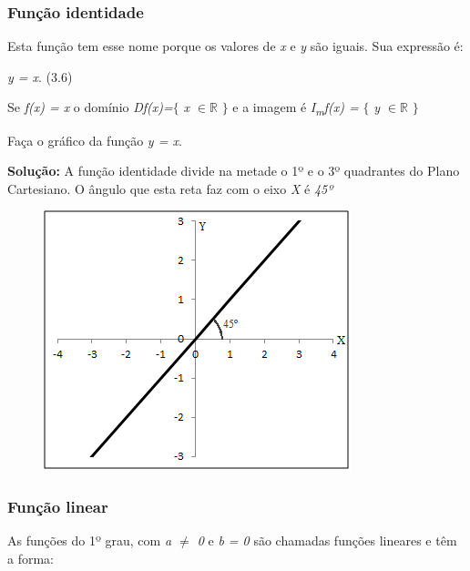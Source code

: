 \subsubsection{Função identidade}

Esta função tem esse nome porque os valores de \textit{x} e \textit{y} são iguais. Sua expressão é:

\begin{caixa}
\textit{y = x}. \tab (3.6)
\end{caixa}

Se \textit{f(x) = x}  o domínio \textit{Df(x)=}$ \{ $ \textit{ x $ \in \mathbb{R} $} $ \} $  e a imagem é \textit{I\textsubscript{m}f(x) =} $ \{ $ \textit{ y $ \in \mathbb{R} $} $ \} $ \qedsymbol{}

\begin{texemplo}
Faça o gráfico da função  \textit{y = x}.

\textbf{Solução:} A função identidade divide na metade o 1º e o 3º quadrantes do Plano Cartesiano. O ângulo que esta reta faz com o eixo \textit{X} é \textit{45º }\qedsymbol{}

\begin{figure}[H]
	\begin{Center}
		\includegraphics[width=3.52in,height=2.98in]{capitulos/funcao_do_primeiro_grau/media/image20.png}
	\end{Center}
\end{figure}
\end{texemplo}

\subsubsection{Função linear}

As funções do 1º grau, com \textit{a $ \neq $   0}  e \textit{b = 0} são chamadas funções lineares e têm a forma:

